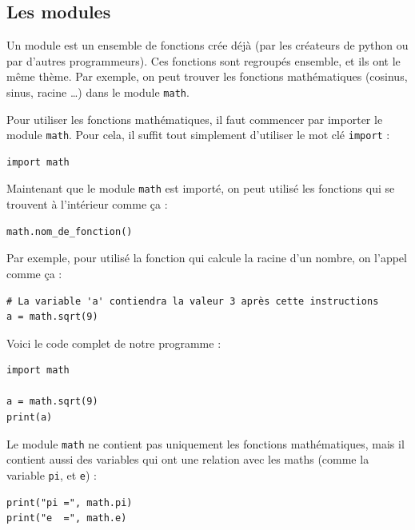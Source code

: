 \documentclass[12pt]{article}
\newcommand{\code}[1]{\colorbox{light-gray}{\texttt{#1}}}
\begin{document}
\clearpage

    \subsection{Les modules}
        Un module est un ensemble de fonctions crée déjà (par les créateurs de python ou par d'autres programmeurs). 
        Ces fonctions sont regroupés ensemble, 
        et ils ont le même thème. Par exemple, on peut trouver les fonctions mathématiques (cosinus, sinus, 
        racine \ldots) dans le module \code{math}. 

        Pour utiliser les fonctions mathématiques, il faut commencer par importer le module \code{math}. Pour cela, 
        il suffit tout simplement d'utiliser le mot clé \code{import} :

        \begin{lstlisting}[style=code]
import math
        \end{lstlisting}

        Maintenant que le module \code{math} est importé, on peut utilisé les fonctions qui se trouvent à l'intérieur 
        comme ça :
        \begin{lstlisting}[style=code]
math.nom_de_fonction()
        \end{lstlisting}

        Par exemple, pour utilisé la fonction qui calcule la racine d'un nombre, on l'appel comme ça :
        \begin{lstlisting}[style=code, breaklines=false]
# La variable 'a' contiendra la valeur 3 après cette instructions
a = math.sqrt(9) 
        \end{lstlisting}

        Voici le code complet de notre programme :
        \begin{lstlisting}[style=code]
import math

a = math.sqrt(9)
print(a)
        \end{lstlisting}


        Le module \code{math} ne contient pas uniquement les fonctions mathématiques, mais il contient aussi
        des variables qui ont une relation avec les maths (comme la variable \code{pi}, et \code{e}) :

        \begin{lstlisting}[style=code]
print("pi =", math.pi)
print("e  =", math.e)
        \end{lstlisting}
\end{document}
